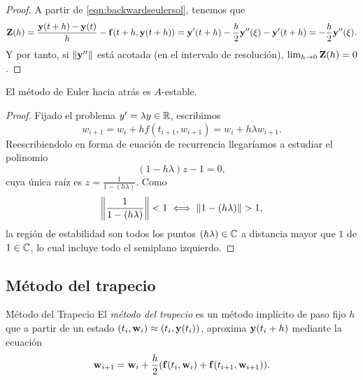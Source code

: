 \begin{proof}
    A partir de \eqref{eqn:backwardseulersol}, tenemos que 
    \begin{equation*}
        \vb{Z}{}(h) =
        \frac{\vb{y}{}(t + h) - \vb{y}{}(t)}{h} - \vb{f}{}(t+h, \vb{y}{}(t+h)) =
        \vb{y}{}'(t + h) - \frac{h}{2}\vb{y}{}''(\xi) - \vb{y}{}'(t+h) =
        - \frac{h}{2}\vb{y}{}''(\xi).
    \end{equation*}
    Y por tanto, si $\norm{\vb{y}{}''}$ está acotada (en el intervalo de resolución),
    $\lim_{h \to 0} \vb{Z}{}(h) = 0$.
\end{proof}


\begin{proposition}
    El método de Euler hacia atrás es $A$-estable.
\end{proposition}

\begin{proof}
    Fijado el problema $y' = \lambda y \in \mathbb{R}$, escribimos
    \begin{equation*}
        w_{i+1} = w_i + hf(t_{i+1}, w_{i+1}) = w_i + h\lambda w_{i+1}.
    \end{equation*}
    Reescribiendolo en forma de euación de recurrencia
    llegaríamos a estudiar el polinomio
    \begin{equation*}
        (1 - h\lambda)z - 1 = 0,
    \end{equation*}
    cuya única raíz es $z = \frac{1}{1 - (h\lambda)}$.
    Como
    \begin{equation*}
        \norm{\frac{1}{1 - (h\lambda)}} < 1 \iff
        \norm{1 - (h\lambda)} > 1,
    \end{equation*}
    la región de estabilidad son todos los puntos $(h\lambda) \in \mathbb{C}$
    a distancia mayor que $1$ de $1 \in \mathbb{C}$,
    lo cual incluye todo el semiplano izquierdo.
\end{proof}

\subsection{Método del trapecio}

\begin{method}{Método del Trapecio}
    El \emph{método del trapecio}
    es un método implícito de paso fijo $h$ que
    a partir de un estado $(t_i, \vb{w}{}_i) \approx (t_i, \vb{y}{}(t_i))$,
    aproxima $\vb{y}{}(t_i + h)$ mediante la ecuación
    \begin{equation}\label{eqn:trapezoidalsol}
        \vb{w}{}_{i+1} = \vb{w}{}_i + \frac{h}{2}\qty(
            \vb{f}{}(t_i, \vb{w}{}_i) + \vb{f}{}(t_{i+1}, \vb{w}{}_{i+1})
        ).
    \end{equation}
\end{method}

